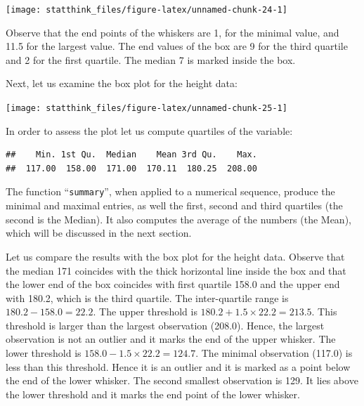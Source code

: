 \documentclass[]{krantz}
\makeatletter
\newenvironment{Shaded}{\begin{snugshade}}{\end{snugshade}}
\newcommand{\FloatTok}[1]{\textcolor[rgb]{0.00,0.00,0.81}{#1}}
\newcommand{\KeywordTok}[1]{\textcolor[rgb]{0.13,0.29,0.53}{\textbf{#1}}}
\newcommand{\NormalTok}[1]{#1}
\newcommand{\OperatorTok}[1]{\textcolor[rgb]{0.81,0.36,0.00}{\textbf{#1}}}
\newenvironment{kframe}{%
\medskip{}
\setlength{\fboxsep}{.8em}
 \def\at@end@of@kframe{}%
 \ifinner\ifhmode%
  \def\at@end@of@kframe{\end{minipage}}%
  \begin{minipage}{\columnwidth}%
 \fi\fi%
 \def\FrameCommand##1{\hskip\@totalleftmargin \hskip-\fboxsep
 \colorbox{shadecolor}{##1}\hskip-\fboxsep
     \hskip-\linewidth \hskip-\@totalleftmargin \hskip\columnwidth}%
 \MakeFramed {\advance\hsize-\width
   \@totalleftmargin\z@ \linewidth\hsize
   \@setminipage}}%
 {\par\unskip\endMakeFramed%
 \at@end@of@kframe}
\renewenvironment{Shaded}{\begin{kframe}}{\end{kframe}}
\theoremstyle{definition}
\theoremstyle{definition}
\theoremstyle{definition}
\theoremstyle{remark}
\makeatother
\begin{document}
\begin{center}\texttt{[image: statthink\_files/figure-latex/unnamed-chunk-24-1]} \end{center}

Observe that the end points of the
whiskers are 1, for the minimal value, and 11.5 for the largest value.
The end values of the box are 9 for the third quartile and 2 for the
first quartile. The median 7 is marked inside the box.

Next, let us examine the box plot for the height data:

\begin{Shaded}
\end{Shaded}

\begin{center}\texttt{[image: statthink\_files/figure-latex/unnamed-chunk-25-1]} \end{center}

In order to assess the plot let us compute quartiles of the variable:

\begin{Shaded}
\end{Shaded}

\begin{verbatim}
##    Min. 1st Qu.  Median    Mean 3rd Qu.    Max. 
##  117.00  158.00  171.00  170.11  180.25  208.00
\end{verbatim}

The function ``\texttt{summary}'', when applied to a numerical sequence, produce
the minimal and maximal entries, as well the first, second and third
quartiles (the second is the Median). It also computes the average of
the numbers (the Mean), which will be discussed in the next section.

Let us compare the results with the box plot for the height data.
Observe that the median 171 coincides
with the thick horizontal line inside the box and that the lower end of
the box coincides with first quartile 158.0 and the upper end with
180.2, which is the third quartile. The inter-quartile range is
\(180.2 - 158.0 = 22.2\). The upper threshold is
\(180.2 + 1.5 \times 22.2 = 213.5\). This threshold is larger than the
largest observation (208.0). Hence, the largest observation is not an
outlier and it marks the end of the upper whisker. The lower threshold
is \(158.0 - 1.5 \times 22.2 = 124.7\). The minimal observation (117.0) is
less than this threshold. Hence it is an outlier and it is marked as a
point below the end of the lower whisker. The second smallest
observation is 129. It lies above the lower threshold and it marks the
end point of the lower whisker.
\end{document}
